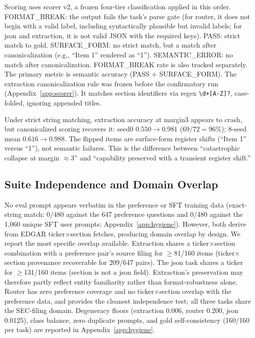 \documentclass{article}
\begin{document}
Scoring uses scorer v2, a frozen four-tier classification applied in this order. FORMAT\_BREAK: the output fails the task's parse gate (for router, it does not begin with a valid label, including syntactically plausible but invalid labels; for json and extraction, it is not valid JSON with the required keys). PASS: strict match to gold. SURFACE\_FORM: no strict match, but a match after canonicalization (e.g., ``Item 1'' rendered as ``1''). SEMANTIC\_ERROR: no match after canonicalization. FORMAT\_BREAK rate is also tracked separately. The primary metric is semantic accuracy (PASS $+$ SURFACE\_FORM). The extraction canonicalization rule was frozen before the confirmatory run (Appendix~\ref{app:scorer}). It matches section identifiers via regex \verb|\d+[A-Z]?|, case-folded, ignoring appended titles.

\begin{tcolorbox}[colback=gray!6,colframe=gray!55,boxrule=0.5pt,left=6pt,right=6pt,top=4pt,bottom=4pt,title={\small\textbf{The scorer artifact: strict versus canonicalized scoring}}]
\small Under strict string matching, extraction accuracy at margin3 appears to crash, but canonicalized scoring recovers it: seed0 $0.550 \to 0.981$ ($69/72 = 96\%$); 8-seed mean $0.616 \to 0.988$. The flipped items are surface-form register shifts (``Item 1'' versus ``1''), not semantic failures. This is the difference between ``catastrophic collapse at margin ${\approx}3$'' and ``capability preserved with a transient register shift.''
\end{tcolorbox}

\subsection{Suite Independence and Domain Overlap}
\label{sec:suite}
No eval prompt appears verbatim in the preference or SFT training data (exact-string match: 0/480 against the 647 preference questions and 0/480 against the 1{,}060 unique SFT user prompts; Appendix~\ref{app:hygiene}). However, both derive from EDGAR ticker$\times$section fetches, producing domain overlap by design. We report the most specific overlap available. Extraction shares a ticker$\times$section combination with a preference pair's source filing for $\ge$81/160 items (ticker$\times$section provenance recoverable for 209/647 pairs). The json task shares a ticker for $\ge$131/160 items (section is not a json field). Extraction's preservation may therefore partly reflect entity familiarity rather than format-robustness alone. Router has zero preference coverage and no ticker$\times$section overlap with the preference data, and provides the cleanest independence test; all three tasks share the SEC-filing domain. Degeneracy floors (extraction 0.006, router 0.200, json 0.0125), class balance, zero duplicate prompts, and gold self-consistency (160/160 per task) are reported in Appendix~\ref{app:hygiene}.
\end{document}
